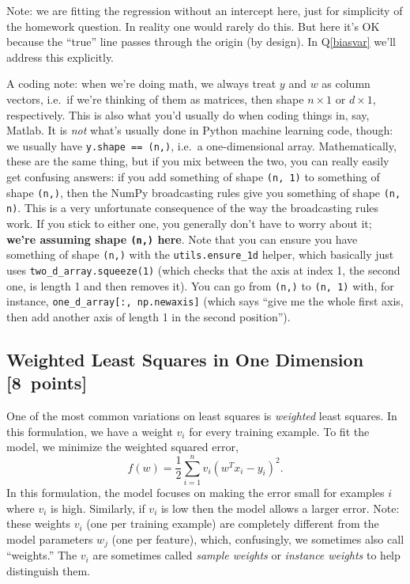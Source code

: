 \documentclass{article}
\newcommand\pts[1]{\textcolor{pointscolour}{[#1~points]}}
\begin{document}
Note: we are fitting the regression without an intercept here, just for simplicity of the homework question.
In reality one would rarely do this. But here it's OK because the ``true'' line
passes through the origin (by design). In Q\ref{biasvar} we'll address this explicitly.

A coding note:
when we're doing math, we always treat $y$ and $w$ as column vectors,
i.e.\ if we're thinking of them as matrices, then shape $n \times 1$ or $d \times 1$, respectively.
This is also what you'd usually do when coding things in, say, Matlab.
It is \emph{not} what's usually done in Python machine learning code, though:
we usually have \verb|y.shape == (n,)|, i.e.\ a one-dimensional array.
Mathematically, these are the same thing, but if you mix between the two,
you can really easily get confusing answers:
if you add something of shape \texttt{(n, 1)} to something of shape \texttt{(n,)},
then the NumPy broadcasting rules give you something of shape \texttt{(n, n)}.
This is a very unfortunate consequence of the way the broadcasting rules work.
If you stick to either one, you generally don't have to worry about it;
\textbf{we're assuming shape \texttt{(n,)} here}.
Note that you can
ensure you have something of shape \texttt{(n,)} with the \texttt{utils.ensure\_1d} helper, which basically just uses
\texttt{two\_d\_array.squeeze(1)}
(which checks that the axis at index 1, the second one, is length 1 and then removes it).
You can go from \texttt{(n,)} to \texttt{(n, 1)} with, for instance, \texttt{one\_d\_array[:, np.newaxis]}
(which says ``give me the whole first axis, then add another axis of length 1 in the second position'').
\newpage
\subsection{Weighted Least Squares in One Dimension \pts{8}}

One of the most common variations on least squares is \emph{weighted} least squares. In this formulation, we have a weight $v_i$ for every training example. To fit the model, we minimize the weighted squared error,
\[
f(w) =  \frac{1}{2}\sum_{i=1}^n v_i(w^Tx_i - y_i)^2.
\]
In this formulation, the model focuses on making the error small for examples $i$ where $v_i$ is high. Similarly, if $v_i$ is low then the model allows a larger error. Note: these weights $v_i$ (one per training example) are completely different from the model parameters $w_j$ (one per feature), which, confusingly, we sometimes also call ``weights.'' The $v_i$ are sometimes called \emph{sample weights} or \emph{instance weights} to help distinguish them.
\end{document}
